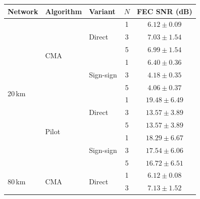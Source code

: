\documentclass[12pt,a4paper]{article}
\begin{document}
\begin{table}[H]
    \centering
    \small
    \begin{tabular}{lllcc}
        \toprule
        Network & Algorithm & Variant & $N$ & FEC SNR (dB) \\
        \midrule
        \multirow{12}{*}{20\,km} & \multirow{6}{*}{CMA}   & \multirow{3}{*}{Direct}    & 1 & $6.12  \pm 0.09$ \\
                                  &                        &                            & 3 & $7.03  \pm 1.54$ \\
                                  &                        &                            & 5 & $6.99  \pm 1.54$ \\
                                  \cmidrule(l){3-5}
                                  &                        & \multirow{3}{*}{Sign-sign} & 1 & $6.40  \pm 0.36$ \\
                                  &                        &                            & 3 & $4.18  \pm 0.35$ \\
                                  &                        &                            & 5 & $4.06  \pm 0.37$ \\
                                  \cmidrule(l){2-5}
                                  & \multirow{6}{*}{Pilot} & \multirow{3}{*}{Direct}    & 1 & $19.48 \pm 6.49$ \\
                                  &                        &                            & 3 & $13.57 \pm 3.89$ \\
                                  &                        &                            & 5 & $13.57 \pm 3.89$ \\
                                  \cmidrule(l){3-5}
                                  &                        & \multirow{3}{*}{Sign-sign} & 1 & $18.29 \pm 6.67$ \\
                                  &                        &                            & 3 & $17.54 \pm 6.06$ \\
                                  &                        &                            & 5 & $16.72 \pm 6.51$ \\
        \midrule
        \multirow{12}{*}{80\,km} & \multirow{6}{*}{CMA}   & \multirow{3}{*}{Direct}    & 1 & $6.12  \pm 0.08$ \\
                                  &                        &                            & 3 & $7.13  \pm 1.52$ \\

\end{tabular}
\end{table}
\end{document}
